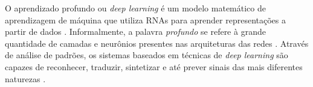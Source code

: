 O aprendizado profundo ou \emph{deep learning} é um modelo matemático de aprendizagem de máquina que utiliza RNAs para aprender representações a partir de dados \cite{ref:chollet, ref:buduma}. Informalmente, a palavra \emph{profundo} se refere à grande quantidade de camadas e neurônios presentes nas arquiteturas das redes \cite{ref:gulli}. Através de análise de padrões, os sistemas baseados em técnicas de \emph{deep learning} são capazes de reconhecer, traduzir, sintetizar e até prever sinais das mais diferentes naturezas \cite{ref:JAI-2017}.

%

%

